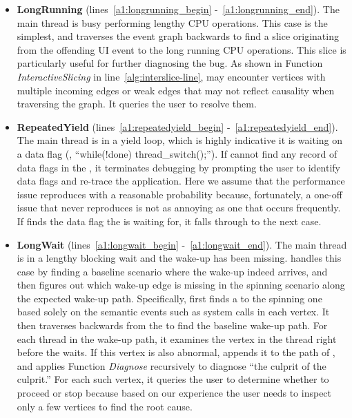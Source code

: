 \begin{itemize}

	\item \textbf{LongRunning} (lines~\ref{a1:longrunning_begin}
		-~\ref{a1:longrunning_end}). The main thread is busy performing lengthy
		CPU operations. This case is the simplest, and \xxx traverses the event
		graph backwards to find a slice originating from the offending UI event
		to the long running CPU operations. This slice is particularly useful for
		further diagnosing the bug. As shown in Function \textit{InteractiveSlicing} in
		line~\ref{alg:interslice-line}, \xxx may encounter vertices with multiple
		incoming edges or weak edges that may not reflect causality when traversing
		the graph. It queries the user to resolve them.

	\item \textbf{RepeatedYield} (lines~\ref{a1:repeatedyield_begin}
		-~\ref{a1:repeatedyield_end}). The main thread is in a yield loop, which
		is highly indicative it is waiting on a data flag (\eg, ``while(!done)
		thread\_switch();''). If \xxx cannot find any record of data flags in the
		\spinningnode, it terminates debugging by prompting the user to identify data
		flags and re-trace the application. Here we assume that the performance issue
		reproduces with a reasonable probability because, fortunately, a one-off issue
		that never reproduces is not as annoying as one that occurs frequently. If
		\xxx finds the data flag the \spinningnode is waiting for, it falls through to
		the next case.

	\item \textbf{LongWait} (lines~\ref{a1:longwait_begin}
		-~\ref{a1:longwait_end}). The main thread is in a lengthy blocking wait and
		the wake-up has been missing. \xxx handles this case by finding a baseline
		scenario where the wake-up indeed arrives, and then figures out which wake-up
		edge is missing in the spinning scenario along the expected wake-up path.
		Specifically, \xxx first finds a \similarnode to the spinning one based solely
		on the semantic events such as system calls in each vertex. It then traverses
		backwards from the \similarnode to find the baseline wake-up path. For each
		thread in the wake-up path, it examines the vertex in the thread right before
		the \spinningnode waits. If this vertex is also abnormal, \xxx appends it
		to the path of \rootcausenodes, and applies Function \textit{Diagnose} recursively
		to diagnose ``the culprit of the culprit.'' For each such vertex, it queries the
		user to determine whether to proceed or stop because based on our experience
		the user needs to inspect only a few vertices to find the root cause.

\end{itemize}

